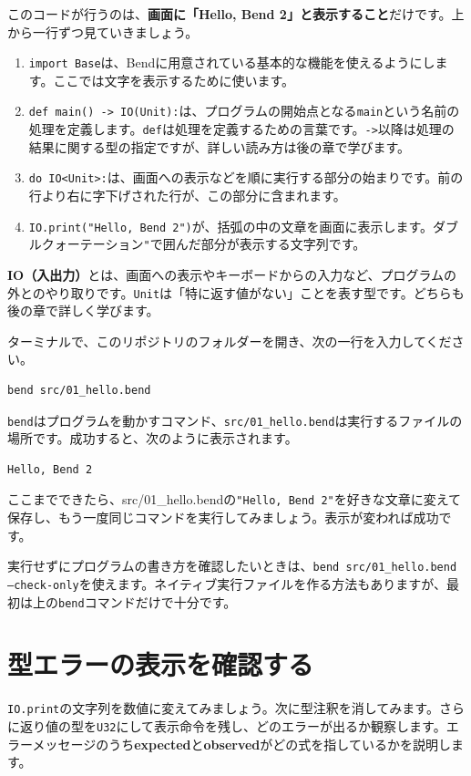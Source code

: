 \documentclass[11pt,a4paper,openany]{book}
\newcommand{\code}[1]{\texttt{#1}}
\newcommand{\file}[1]{\textsf{\color{blue}#1}}
\newcommand{\term}[1]{\textbf{#1}}
\begin{document}
このコードが行うのは、\textbf{画面に「Hello, Bend 2」と表示すること}だけです。上から一行ずつ見ていきましょう。
\begin{enumerate}
\item \code{import Base}は、Bendに用意されている基本的な機能を使えるようにします。ここでは文字を表示するために使います。
\item \code{def main() -> IO(Unit):}は、プログラムの開始点となる\code{main}という名前の処理を定義します。\code{def}は処理を定義するための言葉です。\code{->}以降は処理の結果に関する型の指定ですが、詳しい読み方は後の章で学びます。
\item \code{do IO<Unit>:}は、画面への表示などを順に実行する部分の始まりです。前の行より右に字下げされた行が、この部分に含まれます。
\item \code{IO.print("Hello, Bend 2")}が、括弧の中の文章を画面に表示します。ダブルクォーテーション\code{"}で囲んだ部分が表示する文字列です。
\end{enumerate}

\term{IO（入出力）}とは、画面への表示やキーボードからの入力など、プログラムの外とのやり取りです。\code{Unit}は「特に返す値がない」ことを表す型です。どちらも後の章で詳しく学びます。

ターミナルで、このリポジトリのフォルダーを開き、次の一行を入力してください。
\begin{lstlisting}[language={},caption={最初のプログラムを実行する}]
bend src/01_hello.bend
\end{lstlisting}
\code{bend}はプログラムを動かすコマンド、\code{src/01\_hello.bend}は実行するファイルの場所です。成功すると、次のように表示されます。
\begin{lstlisting}[language={},caption={画面に表示される内容}]
Hello, Bend 2
\end{lstlisting}

ここまでできたら、\file{src/01\_hello.bend}の\code{"Hello, Bend 2"}を好きな文章に変えて保存し、もう一度同じコマンドを実行してみましょう。表示が変われば成功です。

\begin{pointbox}
実行せずにプログラムの書き方を確認したいときは、\code{bend src/01\_hello.bend --check-only}を使えます。ネイティブ実行ファイルを作る方法もありますが、最初は上の\code{bend}コマンドだけで十分です。
\end{pointbox}

\section{型エラーの表示を確認する}
\code{IO.print}の文字列を数値に変えてみましょう。次に型注釈を消してみます。さらに返り値の型を\code{U32}にして表示命令を残し、どのエラーが出るか観察します。エラーメッセージのうち\term{expected}と\term{observed}がどの式を指しているかを説明します。
\end{document}
